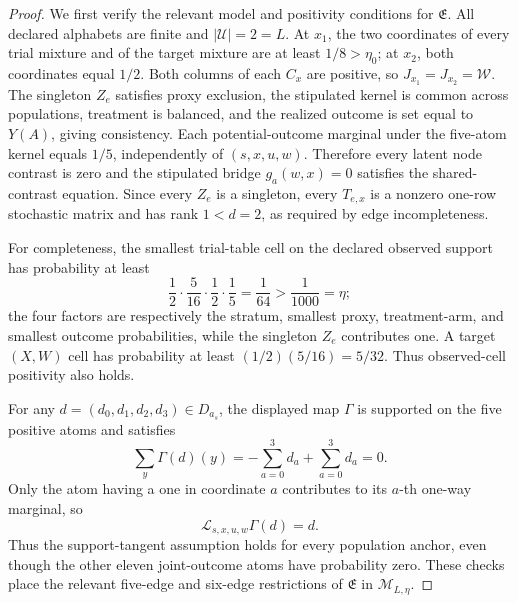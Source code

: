\documentclass{article}
\begin{document}
\begin{proof}
We first verify the relevant model and positivity conditions for \(\mathfrak E\).  All declared alphabets are finite and \(|\mathcal U|=2=L\).  At \(x_1\), the two coordinates of every trial mixture and of the target mixture are at least \(1/8>\eta_0\); at \(x_2\), both coordinates equal \(1/2\).  Both columns of each \(C_x\) are positive, so \(J_{x_1}=J_{x_2}=\mathcal W\).  The singleton \(Z_e\) satisfies proxy exclusion, the stipulated kernel is common across populations, treatment is balanced, and the realized outcome is set equal to \(Y(A)\), giving consistency.  Each potential-outcome marginal under the five-atom kernel equals \(1/5\), independently of \((s,x,u,w)\).  Therefore every latent node contrast is zero and the stipulated bridge \(g_a(w,x)=0\) satisfies the shared-contrast equation.  Since every \(Z_e\) is a singleton, every \(T_{e,x}\) is a nonzero one-row stochastic matrix and has rank \(1<d=2\), as required by edge incompleteness.

For completeness, the smallest trial-table cell on the declared observed support has probability at least
\[
\frac12\cdot\frac5{16}\cdot\frac12\cdot\frac15=\frac1{64}>\frac1{1000}=\eta;
\]
the four factors are respectively the stratum, smallest proxy, treatment-arm, and smallest outcome probabilities, while the singleton \(Z_e\) contributes one.  A target \((X,W)\) cell has probability at least \((1/2)(5/16)=5/32\).  Thus observed-cell positivity also holds.

For any \(d=(d_0,d_1,d_2,d_3)\in D_{a_s}\), the displayed map \(\Gamma\) is supported on the five positive atoms and satisfies
\[
\sum_y\Gamma(d)(y)
=-\sum_{a=0}^3d_a+\sum_{a=0}^3d_a=0.
\]
Only the atom having a one in coordinate \(a\) contributes to its \(a\)-th one-way marginal, so
\[
\mathscr L_{s,x,u,w}\Gamma(d)=d.
\]
Thus the support-tangent assumption holds for every population anchor, even though the other eleven joint-outcome atoms have probability zero.  These checks place the relevant five-edge and six-edge restrictions of \(\mathfrak E\) in \(\mathcal M_{L,\eta}\).


\end{proof}
\end{document}
